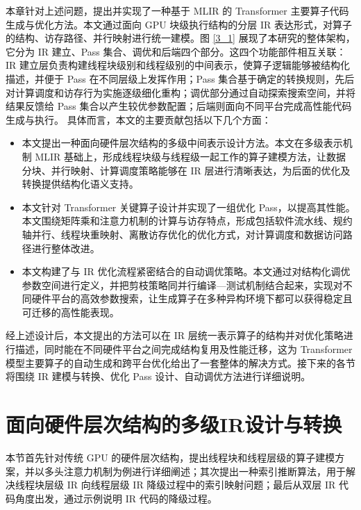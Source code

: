 本章针对上述问题，提出并实现了一种基于 MLIR 的 Transformer 主要算子代码生成与优化方法。本文通过面向 GPU 块级执行结构的分层 IR 表达形式，对算子的结构、访存路径、并行映射进行统一建模。图 \ref{3_1} 展现了本研究的整体架构，它分为 IR 建立、Pass 集合、调优和后端四个部分。这四个功能部件相互关联：IR 建立层负责构建线程块级别和线程级别的中间表示，使算子逻辑能够被结构化描述，并便于 Pass 在不同层级上发挥作用；Pass 集合基于确定的转换规则，先后对计算调度和访存行为实施逐级细化重构；调优部分通过自动探索搜索空间，并将结果反馈给 Pass 集合以产生较优参数配置；后端则面向不同平台完成高性能代码生成与执行。
具体而言，本文的主要贡献包括以下几个方面：
\begin{itemize}
\item 本文提出一种面向硬件层次结构的多级中间表示设计方法。本文在多级表示机制 MLIR 基础上，形成线程块级与线程级一起工作的算子建模方法，让数据分块、并行映射、计算调度策略能够在 IR 层进行清晰表达，为后面的优化及转换提供结构化语义支持。

\item 本文针对 Transformer 关键算子设计并实现了一组优化 Pass，以提高其性能。本文围绕矩阵乘和注意力机制的计算与访存特点，形成包括软件流水线、规约轴并行、线程块重映射、离散访存优化的优化方式，对计算调度和数据访问路径进行整体改进。

\item 本文构建了与 IR 优化流程紧密结合的自动调优策略。本文通过对结构化调优参数空间进行定义，并把剪枝策略同并行编译—测试机制结合起来，实现对不同硬件平台的高效参数搜索，让生成算子在多种异构环境下都可以获得稳定且可迁移的高性能表现。
\end{itemize}

经上述设计后，本文提出的方法可以在 IR 层统一表示算子的结构并对优化策略进行描述，同时能在不同硬件平台之间完成结构复用及性能迁移，这为 Transformer 模型主要算子的自动生成和跨平台优化给出了一套整体的解决方式。接下来的各节将围绕 IR 建模与转换、优化 Pass 设计、自动调优方法进行详细说明。

\section{面向硬件层次结构的多级IR设计与转换}
本节首先针对传统 GPU 的硬件层次结构，提出线程块和线程层级的算子建模方案，并以多头注意力机制为例进行详细阐述；其次提出一种索引推断算法，用于解决线程块层级 IR 向线程层级 IR 降级过程中的索引映射问题；最后从双层 IR 代码角度出发，通过示例说明 IR 代码的降级过程。


